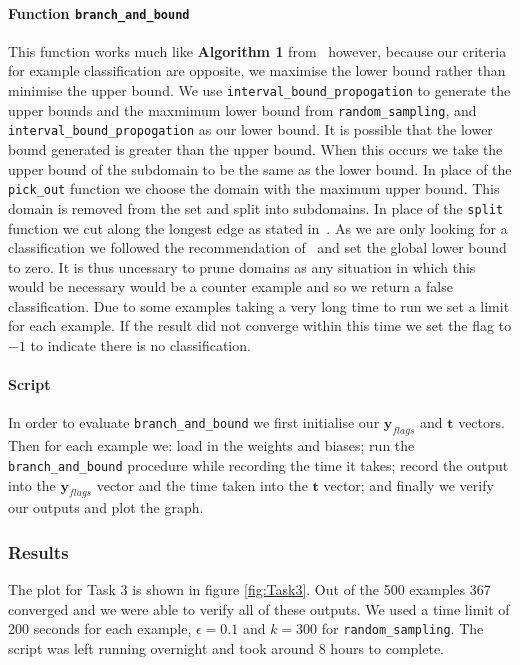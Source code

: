 \documentclass[11pt]{article}
\begin{document}
\paragraph{Function \texttt{branch\_and\_bound}}
This function works much like \textbf{Algorithm 1} from~\cite{NEURIPS2018_be53d253} however, because our criteria for example classification are opposite, we maximise the lower bound rather than minimise the upper bound. 
We use \texttt{interval\_bound\_propogation} to generate the upper bounds and the maxmimum lower bound from \texttt{random\_sampling}, and \texttt{interval\_bound\_propogation} as our lower bound. 
It is possible that the lower bound generated is greater than the upper bound.
When this occurs we take the upper bound of the subdomain to be the same as the lower bound.
In place of the \texttt{pick\_out} function we choose the domain with the maximum upper bound. This domain is removed from the set and split into subdomains. 
In place of the \texttt{split} function we cut along the longest edge as stated in~\cite{NNVNotes}.
As we are only looking for a classification we followed the recommendation of~\cite{NEURIPS2018_be53d253} and set the global lower bound to zero. 
It is thus uncessary to prune domains as any situation in which this would be necessary would be a counter example and so we return a false classification.
Due to some examples taking a very long time to run we set a limit for each example. If the result did not converge within this time we set the flag to $-1$ to indicate there is no classification.
\paragraph{Script}
In order to evaluate \texttt{branch\_and\_bound} we first initialise our $\boldsymbol{y}_{flags}$ and $\boldsymbol{t}$ vectors. 
Then for each example we:
load in the weights and biases;
run the \texttt{branch\_and\_bound} procedure while recording the time it takes;
record the output into the $\boldsymbol{y}_{flags}$ vector and the time taken into the $\boldsymbol{t}$ vector;
and finally we verify our outputs and plot the graph.
\subsubsection{Results} The plot for Task 3 is shown in figure \ref{fig:Task3}.
Out of the 500 examples 367 converged and we were able to verify all of these outputs. 
We used a time limit of 200 seconds for each example, $\epsilon=0.1$ and $k=300$ for \texttt{random\_sampling}. 
The script was left running overnight and took around 8 hours to complete.
 
\end{document}
